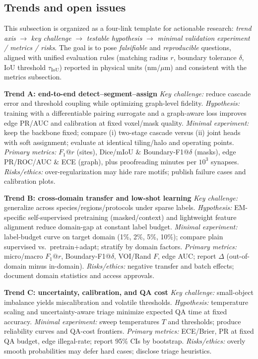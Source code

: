 \subsection{Trends and open issues}

This subsection is organized as a four-link template for actionable research: \emph{trend axis} \(\rightarrow\) \emph{key challenge} \(\rightarrow\) \emph{testable hypothesis} \(\rightarrow\) \emph{minimal validation experiment / metrics / risks}. The goal is to pose \emph{falsifiable} and \emph{reproducible} questions, aligned with unified evaluation rules (matching radius \(r\), boundary tolerance \(\delta\), IoU threshold \(\tau_{\mathrm{IoU}}\)) reported in physical units (nm/\(\mu\)m) and consistent with the metrics subsection.

\medskip
\noindent\textbf{Trend A: end-to-end detect--segment--assign}\;
\emph{Key challenge:} reduce cascade error and threshold coupling while optimizing graph-level fidelity. 
\emph{Hypothesis:} training with a differentiable pairing surrogate and a graph-aware loss improves edge PR/AUC and calibration at fixed voxel/mask quality. 
\emph{Minimal experiment:} keep the backbone fixed; compare (i) two-stage cascade versus (ii) joint heads with soft assignment; evaluate at identical tiling/halo and operating points. 
\emph{Primary metrics:} \(F_1@r\) (sites), Dice/mIoU \(\&\) Boundary-F1@\(\delta\) (masks), edge PR/ROC/AUC \(\&\) ECE (graph), plus proofreading minutes per \(10^3\) synapses. 
\emph{Risks/ethics:} over-regularization may hide rare motifs; publish failure cases and calibration plots.

\medskip
\noindent\textbf{Trend B: cross-domain transfer and low-shot learning}\;
\emph{Key challenge:} generalize across species/regions/protocols under sparse labels. 
\emph{Hypothesis:} EM-specific self-supervised pretraining (masked/context) and lightweight feature alignment reduce domain-gap at constant label budget. 
\emph{Minimal experiment:} label-budget curve on target domain (1\%, 2\%, 5\%, 10\%); compare plain supervised vs.\ pretrain+adapt; stratify by domain factors. 
\emph{Primary metrics:} micro/macro \(F_1@r\), Boundary-F1@\(\delta\), VOI/Rand \(F\), edge AUC; report \(\Delta\) (out-of-domain minus in-domain). 
\emph{Risks/ethics:} negative transfer and batch effects; document domain statistics and access approvals.

\medskip
\noindent\textbf{Trend C: uncertainty, calibration, and QA cost}\;
\emph{Key challenge:} small-object imbalance yields miscalibration and volatile thresholds. 
\emph{Hypothesis:} temperature scaling and uncertainty-aware triage minimize expected QA time at fixed accuracy. 
\emph{Minimal experiment:} sweep temperatures \(T\) and thresholds; produce reliability curves and QA-cost frontiers. 
\emph{Primary metrics:} ECE/Brier, PR at fixed QA budget, edge illegal-rate; report 95\% CIs by bootstrap. 
\emph{Risks/ethics:} overly smooth probabilities may defer hard cases; disclose triage heuristics.

